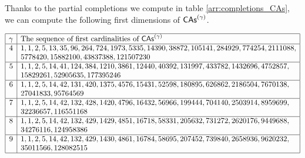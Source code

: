 Thanks to the partial completions we compute in table
\eqref{arr:completions_CAs}, we can compute the following first 
dimensions of $\mathsf{CAs}^{\left(\gamma\right)}$.
\begin{center}
  \begin{math} \label{arr:dimensions_CAs}
    \begin{array}{|c|l|} 
      \hline
      \gamma & \mbox{The sequence of first cardinalities of } 
       \mathsf{CAs}^{\left(\gamma\right)}\\ \hline
      4 & 1, 1, 2, 5, 13, 35, 96, 264, 724, 1973, 5335, 14390, 38872,
          105141, 284929, 774254, 2111088,\\
        & 5778420, 15882100, 43837388, 121507230 \\ \hline
      5 & 1, 1, 2, 5, 14, 41, 124, 384, 1210, 3861, 12440, 40392, 131997,
          433782, 1432696, 4752857, \\ 
        & 15829261, 52905635, 177395246 \\ \hline
      6 & 1, 1, 2, 5, 14, 42, 131, 420, 1375, 4576, 15431, 52598, 180895,
          626862, 2186504, 7670138, \\ 
        & 27041833, 95764569 \\ \hline
      7 & 1, 1, 2, 5, 14, 42, 132, 428, 1420, 4796, 16432, 56966, 199444,
          704140, 2503914, 8959699, \\
        & 32236657, 116551168\\ \hline
      8 & 1, 1, 2, 5, 14, 42, 132, 429, 1429, 4851, 16718, 58331, 205632,
          731272, 2620176, 9449688, \\
        & 34276116, 124958386\\ \hline
      9 & 1, 1, 2, 5, 14, 42, 132, 429, 1430, 4861, 16784, 58695, 207452,
          739840, 2658936, 9620232, \\
        & 35011566, 128082515\\ \hline
    \end{array}
  \end{math}
\end{center}

